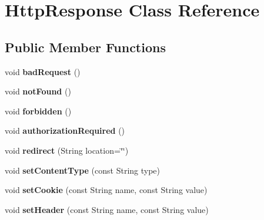\hypertarget{class_http_response}{}\section{Http\+Response Class Reference}
\label{class_http_response}
\subsection*{Public Member Functions}
\begin{DoxyCompactItemize}
\item 
\hypertarget{class_http_response_a6ddc1855eb97864ffef28eb9a491358b}{}void {\bfseries bad\+Request} ()\label{class_http_response_a6ddc1855eb97864ffef28eb9a491358b}

\item 
\hypertarget{class_http_response_ab710c73aa65ac0506d130f6841e6194a}{}void {\bfseries not\+Found} ()\label{class_http_response_ab710c73aa65ac0506d130f6841e6194a}

\item 
\hypertarget{class_http_response_a1e5c9dd005e4e7afd1f99308b5460b2d}{}void {\bfseries forbidden} ()\label{class_http_response_a1e5c9dd005e4e7afd1f99308b5460b2d}

\item 
\hypertarget{class_http_response_aa91856817a881e9bd6db0b837e68b2c0}{}void {\bfseries authorization\+Required} ()\label{class_http_response_aa91856817a881e9bd6db0b837e68b2c0}

\item 
\hypertarget{class_http_response_abbe53a6919902bfb8b254fab864ae175}{}void {\bfseries redirect} (String location=\char`\"{}\char`\"{})\label{class_http_response_abbe53a6919902bfb8b254fab864ae175}

\item 
\hypertarget{class_http_response_ae1f5df51a03dfbcad9d82d650418713a}{}void {\bfseries set\+Content\+Type} (const String type)\label{class_http_response_ae1f5df51a03dfbcad9d82d650418713a}

\item 
\hypertarget{class_http_response_af91b228bc40b7222557b24d1d97601ad}{}void {\bfseries set\+Cookie} (const String name, const String value)\label{class_http_response_af91b228bc40b7222557b24d1d97601ad}

\item 
\hypertarget{class_http_response_a2e556aaccd751726df7ee1dc8dc95dca}{}void {\bfseries set\+Header} (const String name, const String value)\label{class_http_response_a2e556aaccd751726df7ee1dc8dc95dca}


\end{DoxyCompactItemize}
